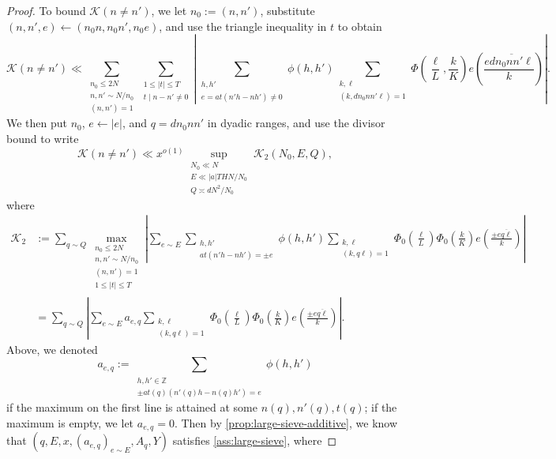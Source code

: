\documentclass[reqno,11pt]{amsart}
\theoremstyle{remark}
\numberwithin{equation}{section}
\newcommand{\Z}{\mathbb{Z}}
\newcommand{\mK}{\mathcal{K}}
\renewcommand{\bar}{\overline}
\begin{document}
\begin{proof}
To bound $\mK(n \neq n')$, we let $n_0 := (n, n')$, substitute $(n, n', e) \gets (n_0 n, n_0 n', n_0 e)$, and use the triangle inequality in $t$ to obtain
\[
    \mK(n \neq n') \ll 
    \sum_{\substack{n_0 \le 2N \\ n, n' \sim N/n_0 \\ (n, n') = 1}}
    \sum_{\substack{1 \le |t| \le T \\ t \mid n - n' \neq 0}}
    \left\vert
    \sum_{\substack{h, h'\\ e = at(n'h - nh') \neq 0}} \phi(h, h')
    \sum_{\substack{k, \ell \\ (k, dn_0nn'\ell) = 1}}
    \Phi\left(\frac{\ell}{L}, \frac{k}{K}\right)
    e\left(\frac{e\bar{dn_0nn'\ell}}{k}\right) \right \vert.
\]
We then put $n_0$, $e \gets |e|$, and $q = dn_0 n n'$ in dyadic ranges, and use the divisor bound to write
\begin{equation} \label{eq:K-off-diag-split}
    \mK(n \neq n') \ll 
    x^{o(1)} \sup_{\substack{N_0 \ll N \\ E \ll |a| THN/N_0 \\ Q \asymp d N^2/N_0}} \mK_2(N_0, E, Q),
\end{equation}
where
\[
\begin{aligned}
    \mK_2 &:=
    \sum_{q \sim Q} \max_{\substack{n_0 \le 2N \\ n, n' \sim N/n_0 \\ (n, n') = 1 \\ 1 \le |t| \le T}}
    \left \vert
    \sum_{e \sim E} 
    \sum_{\substack{h, h' \\ at(n'h - nh') = \pm e}} \phi(h, h')
    \sum_{\substack{k, \ell \\ (k, q\ell) = 1}}
    \Phi_0\left(\frac{\ell}{L}\right)
    \Phi_0\left(\frac{k}{K}\right)  
    e\left(\frac{\pm e \bar{q\ell}}{k}\right) \right \vert
    \\
    &=
    \sum_{q \sim Q} 
    \left \vert
    \sum_{e \sim E} 
    a_{e,q}
    \sum_{\substack{k, \ell \\ (k, q\ell) = 1}}
    \Phi_0\left(\frac{\ell}{L}\right)
    \Phi_0\left(\frac{k}{K}\right)  
    e\left(\frac{\pm e \bar{q\ell}}{k}\right) \right \vert.
\end{aligned}
\]
Above, we denoted
\[
    a_{e,q} := \sum_{\substack{h, h' \in \Z \\ \pm at(q)(n'(q)h - n(q)h') = e}} \phi(h, h')
\]
if the maximum on the first line is attained at some $n(q), n'(q), t(q)$; if the maximum is empty, we let $a_{e,q} = 0$. Then by \cref{prop:large-sieve-additive}, we know that $(q, E, x, (a_{e,q})_{e \sim E}, A_q, Y)$ satisfies \cref{ass:large-sieve}, where 

\end{proof}
\end{document}

